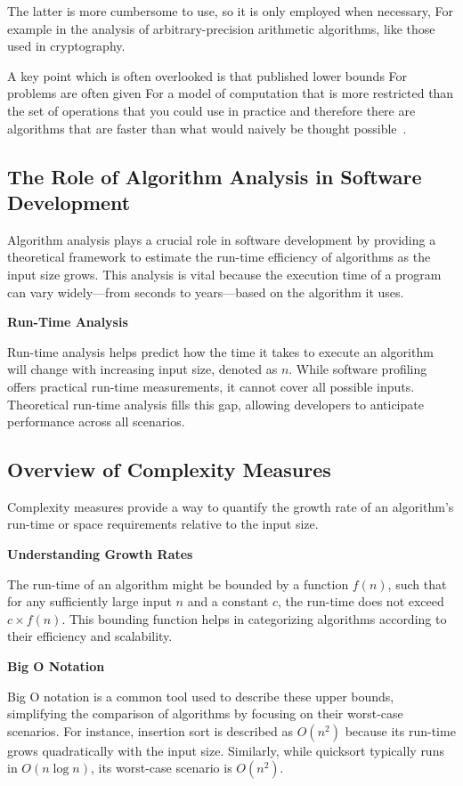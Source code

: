 \documentclass[12pt]{book} %
\begin{document}
The latter is more cumbersome to use, so it is only employed when necessary, For example in the analysis of arbitrary-precision arithmetic algorithms, like those used in cryptography.

A key point which is often overlooked is that published lower bounds For problems are often given For a model of computation that is more restricted than the set of operations that you could use in practice and therefore there are algorithms that are faster than what would naively be thought possible~\cite{PriceAbstraction}.

\subsection{The Role of Algorithm Analysis in Software Development}

Algorithm analysis plays a crucial role in software development by providing a theoretical framework to estimate the run-time efficiency of algorithms as the input size grows. This analysis is vital because the execution time of a program can vary widely—from seconds to years—based on the algorithm it uses.

\textbf{Run-Time Analysis}

Run-time analysis helps predict how the time it takes to execute an algorithm will change with increasing input size, denoted as \(n\). While software profiling offers practical run-time measurements, it cannot cover all possible inputs. Theoretical run-time analysis fills this gap, allowing developers to anticipate performance across all scenarios.

\subsection{Overview of Complexity Measures}

Complexity measures provide a way to quantify the growth rate of an algorithm's run-time or space requirements relative to the input size.

\textbf{Understanding Growth Rates}

The run-time of an algorithm might be bounded by a function \(f(n)\), such that for any sufficiently large input \(n\) and a constant \(c\), the run-time does not exceed \(c \times f(n)\). This bounding function helps in categorizing algorithms according to their efficiency and scalability.

\textbf{Big O Notation}

Big O notation is a common tool used to describe these upper bounds, simplifying the comparison of algorithms by focusing on their worst-case scenarios. For instance, insertion sort is described as \(O(n^2)\) because its run-time grows quadratically with the input size. Similarly, while quicksort typically runs in \(O(n \log n)\), its worst-case scenario is \(O(n^2)\).
\end{document}
